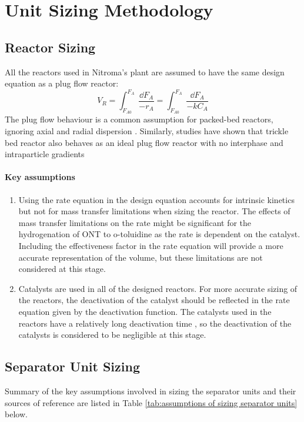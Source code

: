 \section{Unit Sizing Methodology}
\label{app:sizing}
\subsection{Reactor Sizing}

All the reactors used in Nitroma's plant are assumed to have the same design equation as a plug flow reactor:
\begin{equation}
    V_R = \int_{F_{A0}}^{F_{A}} \frac{\dd F_A}{-r_A} = \int_{F_{A0}}^{F_{A}} \frac{\dd F_A}{-kC_A}
    \label{reactor_sizing}
\end{equation}
The plug flow behaviour is a common assumption for packed-bed reactors, ignoring axial and radial dispersion \cite{froment_chemical_nodate}. Similarly, studies have shown that  trickle bed reactor also behaves as an ideal plug flow reactor with no interphase and intraparticle gradients \cite{p_a_ramachandran_recent_1987} 

\paragraph{Key assumptions}
\begin{enumerate}
    \item Using the rate equation in the design equation accounts for intrinsic kinetics but not for mass transfer limitations when sizing the reactor. The effects of mass transfer limitations on the rate might be significant for the hydrogenation of ONT to o-toluidine as the rate is dependent on the catalyst. Including the effectiveness factor in the rate equation will provide a more accurate representation of the volume, but these limitations are not considered at this stage.
    \item Catalysts are used in all of the designed reactors. For more accurate sizing of the reactors, the deactivation of the catalyst should be reflected in the rate equation given by the deactivation function. The catalysts used in the reactors have a relatively long deactivation time \cite{temizel_novel_2020}, so the deactivation of the catalysts is considered to be negligible at this stage.
\end{enumerate}

\subsection{Separator Unit Sizing}
Summary of the key assumptions involved in sizing the separator units and their sources of reference are listed in Table \ref{tab:assumptions of sizing separator units} below. 

